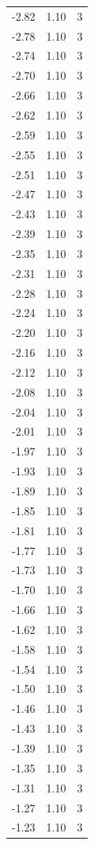 \begin{longtable}{lrr}
  -2.82 & 1.10 & 3 \\
  -2.78 & 1.10 & 3 \\
  -2.74 & 1.10 & 3 \\
  -2.70 & 1.10 & 3 \\
  -2.66 & 1.10 & 3 \\
  -2.62 & 1.10 & 3 \\
  -2.59 & 1.10 & 3 \\
  -2.55 & 1.10 & 3 \\
  -2.51 & 1.10 & 3 \\
  -2.47 & 1.10 & 3 \\
  -2.43 & 1.10 & 3 \\
  -2.39 & 1.10 & 3 \\
  -2.35 & 1.10 & 3 \\
  -2.31 & 1.10 & 3 \\
  -2.28 & 1.10 & 3 \\
  -2.24 & 1.10 & 3 \\
  -2.20 & 1.10 & 3 \\
  -2.16 & 1.10 & 3 \\
  -2.12 & 1.10 & 3 \\
  -2.08 & 1.10 & 3 \\
  -2.04 & 1.10 & 3 \\
  -2.01 & 1.10 & 3 \\
  -1.97 & 1.10 & 3 \\
  -1.93 & 1.10 & 3 \\
  -1.89 & 1.10 & 3 \\
  -1.85 & 1.10 & 3 \\
  -1.81 & 1.10 & 3 \\
  -1.77 & 1.10 & 3 \\
  -1.73 & 1.10 & 3 \\
  -1.70 & 1.10 & 3 \\
  -1.66 & 1.10 & 3 \\
  -1.62 & 1.10 & 3 \\
  -1.58 & 1.10 & 3 \\
  -1.54 & 1.10 & 3 \\
  -1.50 & 1.10 & 3 \\
  -1.46 & 1.10 & 3 \\
  -1.43 & 1.10 & 3 \\
  -1.39 & 1.10 & 3 \\
  -1.35 & 1.10 & 3 \\
  -1.31 & 1.10 & 3 \\
  -1.27 & 1.10 & 3 \\
  -1.23 & 1.10 & 3 \\

\end{longtable}

